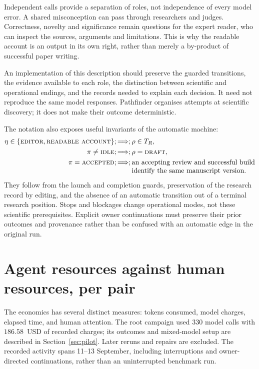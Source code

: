 \documentclass[11pt,a4paper]{article}
\newcommand{\st}[1]{\textsc{#1}}
\begin{document}
Independent calls provide a separation of roles, not independence of every model
error. A shared misconception can pass through researchers and judges.
Correctness, novelty and significance remain questions for the expert reader,
who can inspect the sources, arguments and limitations. This is why the readable
account is an output in its own right, rather than merely a by-product of
successful paper writing.

An implementation of this description should preserve the guarded transitions,
the evidence available to each role, the distinction between scientific and
operational endings, and the records needed to explain each decision. It need
not reproduce the same model responses. Pathfinder organises attempts at
scientific discovery; it does not make their outcome deterministic.

The notation also exposes useful invariants of the automatic machine:
\[
 \begin{aligned}
 \eta\in\{\st{editor},\st{readable\ account}\}
    &;\Longrightarrow;\rho\in T_R,\\
 \pi\ne\st{idle}
    &;\Longrightarrow;\rho=\st{draft},\\
 \pi=\st{accepted}
    &;\Longrightarrow;\begin{array}[t]{@{}l@{}}
       \text{an accepting review and successful build}\\
       \text{identify the same manuscript version.}
     \end{array}
 \end{aligned}
\]
They follow from the launch and completion guards, preservation of the research
record by editing, and the absence of an automatic transition out of a terminal
research position. Stops and blockages change operational modes, not these
scientific prerequisites. Explicit owner continuations must preserve their prior
outcomes and provenance rather than be confused with an automatic edge in the
original run.

\appendix
\section{Agent resources against human resources, per pair}
\label{app:resources}

The economics has several distinct measures: tokens consumed, model charges,
elapsed time, and human attention. The root campaign used $330$ model calls
with $186.58$~USD of recorded charges; its outcomes and mixed-model setup are
described in Section~\ref{sec:pilot}. Later reruns and repairs are excluded.
The recorded activity spans 11--13 September, including interruptions and
owner-directed continuations, rather than an uninterrupted benchmark run.
\end{document}
